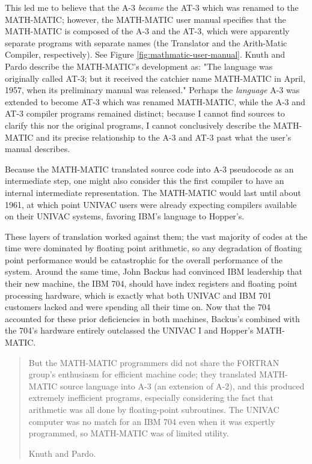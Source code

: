 This led me to believe that the A-3 \textit{became} the AT-3 which was
renamed to the MATH-MATIC; however, the MATH-MATIC user manual
\cite{ash_etal_1957_math-matic_manual} specifies that the MATH-MATIC
is composed of the A-3 and the AT-3, which were apparently separate
programs with separate names (the Translator and the Arith-Matic Compiler,
respectively).
See Figure \ref{fig:mathmatic-user-manual}.
Knuth and Pardo describe the MATH-MATIC's development as:
"The language was originally called AT-3; but it received the catchier name 
MATH-MATIC in April, 1957, when its preliminary manual was released."
\cite{Knuth_TrabbPardo_1976_Early_Development}
Perhaps the \textit{language} A-3 was extended to become AT-3 which was
renamed MATH-MATIC, while the A-3 and AT-3 compiler programs remained
distinct; because I cannot find sources to clarify this nor the
original programs, I cannot conclusively describe the MATH-MATIC
and its precise relationship to the A-3 and AT-3 past what the
user's manual describes.

Because the MATH-MATIC translated source code into A-3 pseudocode
as an intermediate step, one might also consider this the first compiler
to have an internal intermediate representation.
The MATH-MATIC would last until about 1961, at which point UNIVAC users
were already expecting \FTN{} compilers available on their UNIVAC systems,
favoring IBM's language to Hopper's.

These layers of translation worked against them; the vast majority
of codes at the time were dominated by floating point arithmetic,
so any degradation of floating point performance would be catastrophic for the 
overall performance of the system.
Around the same time, John Backus had convinced IBM leadership that 
their new machine, the IBM 704, should have index registers and floating point 
processing hardware, which is exactly what both UNIVAC and IBM 701 customers
lacked and were spending all their time on.
Now that the 704 accounted for these prior deficiencies in both machines,
Backus's \FTN{} combined with the 704's hardware entirely outclassed the
UNIVAC I and Hopper's MATH-MATIC.

\begin{quotation}
But the MATH-MATIC programmers did not share the FORTRAN group's enthusiasm for 
efficient machine code; they translated MATH-MATIC source language into A-3 (an 
extension of A-2), and this produced extremely inefficient programs, especially 
considering the fact that arithmetic was all done by floating-point 
subroutines. The UNIVAC computer was no match for an IBM 704 even when it was 
expertly programmed, so MATH-MATIC was of limited utility.

Knuth and Pardo\cite{Knuth_TrabbPardo_1976_Early_Development}.
\end{quotation}

